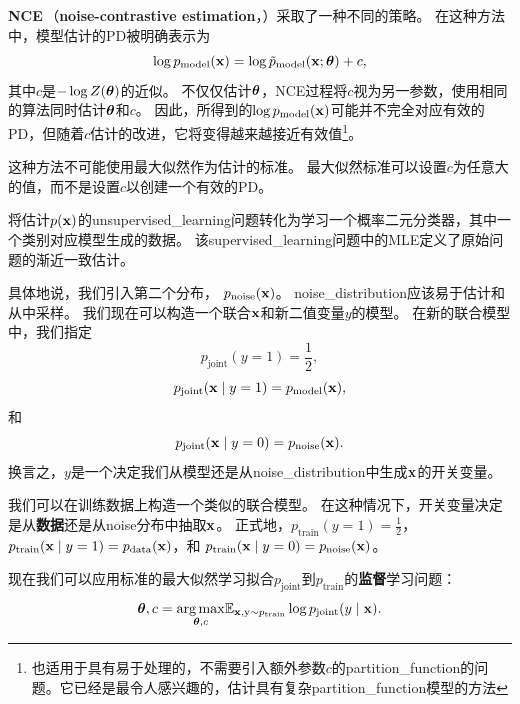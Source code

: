 \textbf{\gls{NCE}}\,（\textbf{noise-contrastive estimation}，）\citep{Gutmann+Hyvarinen-2010}采取了一种不同的策略。
 在这种方法中，模型估计的\gls{PD}被明确表示为
\begin{equation}
	\log p_{\text{model}} (\mathbf{x}) = \log \tilde{p}_{\text{model}} (\mathbf{x}; \boldsymbol{\theta}) + c,
\end{equation}
其中$c$是$-\log Z(\boldsymbol{\theta})$的近似。
不仅仅估计$\boldsymbol{\theta}$，\gls{NCE}过程将$c$视为另一参数，使用相同的算法同时估计$\boldsymbol{\theta}$和$c$。
因此，所得到的$\log p_{\text{model}}(\mathbf{x})$可能并不完全对应有效的\gls{PD}，但随着$c$估计的改进，它将变得越来越接近有效值\footnote{也适用于具有易于处理的，不需要引入额外参数$c$的\gls{partition_function}的问题。它已经是最令人感兴趣的，估计具有复杂\gls{partition_function}模型的方法}。


这种方法不可能使用最大似然作为估计的标准。
最大似然标准可以设置$c$为任意大的值，而不是设置$c$以创建一个有效的\gls{PD}。


将估计$p(\mathbf{x})$的\gls{unsupervised_learning}问题转化为学习一个概率二元分类器，其中一个类别对应模型生成的数据。
该\gls{supervised_learning}问题中的\gls{MLE}定义了原始问题的渐近一致估计。


具体地说，我们引入第二个分布， $p_{\text{noise}}(\mathbf{x})$。
\gls{noise_distribution}应该易于估计和从中采样。
我们现在可以构造一个联合$\mathbf{x}$和新二值变量$y$的模型。
在新的联合模型中，我们指定
\begin{equation}
	p_{\text{joint}} (y = 1) = \frac{1}{2},
\end{equation}
\begin{equation}
	p_{\text{joint}} (\mathbf{x} \mid y = 1) = p_{\text{model}} (\mathbf{x}),
\end{equation}
和
\begin{equation}
	p_{\text{joint}} (\mathbf{x} \mid y = 0) = p_{\text{noise}}(\mathbf{x}).
\end{equation}
换言之，$y$是一个决定我们从模型还是从\gls{noise_distribution}中生成$\mathbf{x}$的开关变量。


我们可以在训练数据上构造一个类似的联合模型。
在这种情况下，开关变量决定是从\textbf{数据}还是从\gls{noise}分布中抽取$\mathbf{x}$。
正式地，$p_{\text{train}}(y = 1) = \frac{1}{2}$，$p_{\text{train}}( \mathbf{x} \mid y = 1) = p_{\text{data}}( \mathbf{x})$，和
$p_{\text{train}}(\mathbf{x} \mid y = 0) = p_{\text{noise}}(\mathbf{x})$。


现在我们可以应用标准的最大似然学习拟合$p_{\text{joint}}$到$p_{\text{train}}$的\textbf{监督}学习问题：
\begin{equation}
	\boldsymbol{\theta}, c = \underset{ \boldsymbol{\theta}, c}{\arg\max} \mathbb{E}_{\mathbf{x}, \mathrm{y} \sim p_{\text{train}}} \log 
	p_{\text{joint}} (y \mid \mathbf{x}).
\end{equation}


